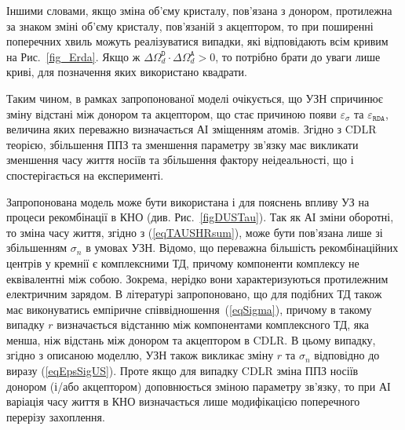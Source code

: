 Іншими словами,
якщо зміна об'єму кристалу, пов'язана з донором, протилежна за знаком зміні об'єму кристалу, пов'язаній з акцептором, то
при поширенні поперечних хвиль можуть реалізуватися випадки, які відповідають всім кривим на Рис.~\ref{fig_Erda}.
Якщо ж $\Delta\Omega_d^\mathtt{D}\cdot\Delta\Omega_d^\mathtt{A}>0$, то потрібно брати до уваги лише криві, для позначення
яких використано квадрати.


Таким чином, в рамках запропонованої моделі очікується, що УЗН спричинює зміну відстані між донором та акцептором,
що стає причиною появи $\varepsilon_{\sigma}$ та $\varepsilon_{\mathtt{RDA}}$, величина яких переважно визначається АІ зміщенням атомів.
Згідно з CDLR теорією,
збільшення ППЗ та зменшення параметру зв'язку має викликати зменшення часу життя носіїв та збільшення фактору неідеальності,
що і спостерігається на експерименті.


Запропонована модель може бути використана і для пояснень впливу УЗ на процеси рекомбінації в КНО (див. Рис.~\ref{figDUSTau}).
Так як АІ зміни оборотні, то зміна часу життя, згідно з (\ref{eqTAUSHRsum}), може бути пов'язана лише зі збільшенням
$\sigma_n$ в умовах УЗН.
Відомо, що переважна більшість рекомбінаційних центрів у кремнії є комплексними ТД,
причому компоненти комплексу не еквівалентні між собою.
Зокрема, нерідко вони характеризуються протилежним електричним зарядом.
В літературі \cite{CDLR:R2} запропоновано, що для подібних ТД також має виконуватись емпіричне співвідношення~(\ref{eqSigma}),
причому в такому випадку $r$ визначається відстанню між компонентами комплексного ТД, яка  менша, ніж відстань між донором та акцептором в CDLR.
В цьому випадку, згідно з описаною моделлю, УЗН також викликає зміну $r$ та $\sigma_n$ відповідно до виразу (\ref{eqEpsSigUS}).
Проте якщо для випадку CDLR зміна ППЗ носіїв донором (і/або акцептором) доповнюється зміною параметру зв'язку,
то при АІ варіація часу життя в КНО визначається лише модифікацією поперечного перерізу захоплення.

